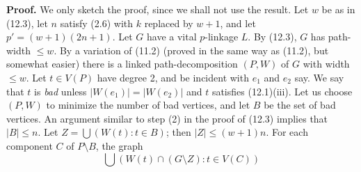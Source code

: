 \textbf{Proof.} We only sketch the proof, since we shall not use the result. Let $w$ be as in (12.3), let $n$ satisfy (2.6) with $k$ replaced by $w + 1$, and let $p' = (w + 1)(2n + 1)$. Let $G$ have a vital $p$-linkage $L$. By (12.3), $G$ has path-width $\le w$. By a variation of (11.2) (proved in the same way as (11.2), but somewhat easier) there is a linked path-decomposition $(P, W)$ of $G$ with width $\le w$. Let $t \in V(P)$ have degree 2, and be incident with $e_1$ and $e_2$ say. We say that $t$ is \textit{bad} unless $|W(e_1)| = |W(e_2)|$ and $t$ satisfies (12.1)(iii).  Let us choose $(P, W)$ to minimize the number of bad vertices, and let $B$ be the set of bad vertices. An argument similar to step (2) in the proof of (12.3) implies that $|B| \le n$. Let $Z = \bigcup (W(t) : t \in B)$; then $|Z| \le (w + 1)n$. For each component $C$ of $P \setminus B$, the graph
\begin{equation*}
\bigcup(W(t) \cap (G \setminus Z) : t \in V(C))
\end{equation*}
